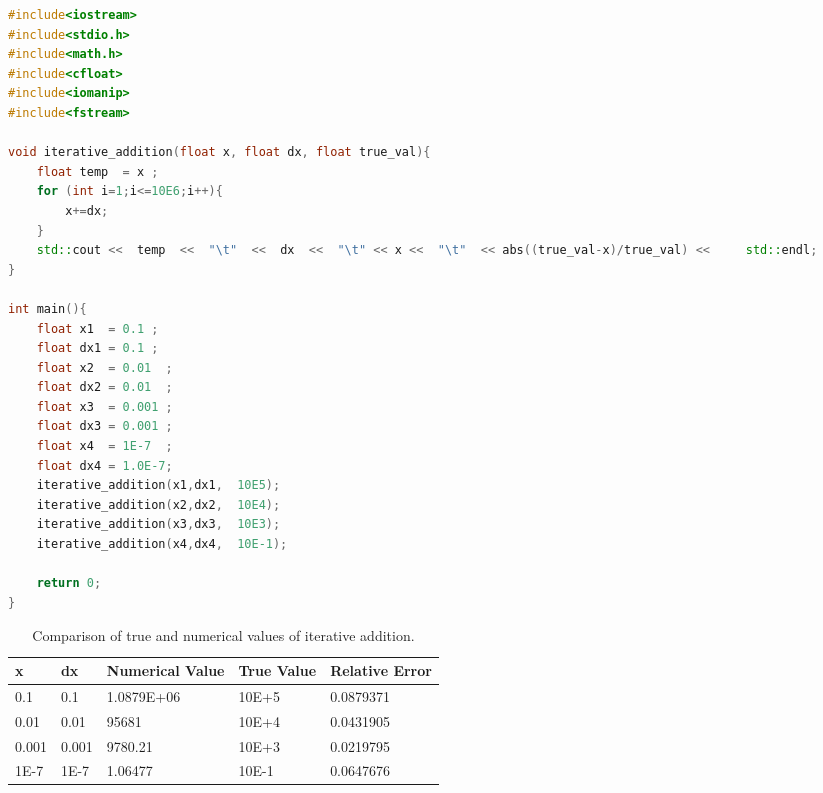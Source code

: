 \documentclass[a4,12pt]{article}
\numberwithin{equation}{subsection}
\begin{document}
 \begin{lstlisting}[language=C++, caption= C++ code to implement iterative addition algorithm., label= list2]
#include<iostream>
#include<stdio.h>
#include<math.h>
#include<cfloat>
#include<iomanip>
#include<fstream>

void iterative_addition(float x, float dx, float true_val){
    float temp  = x ;
    for (int i=1;i<=10E6;i++){
        x+=dx;
    }
    std::cout <<  temp  <<  "\t"  <<  dx  <<  "\t" << x <<  "\t"  << abs((true_val-x)/true_val) <<     std::endl;
}

int main(){
    float x1  = 0.1 ;
    float dx1 = 0.1 ;
    float x2  = 0.01  ;
    float dx2 = 0.01  ;
    float x3  = 0.001 ;
    float dx3 = 0.001 ;
    float x4  = 1E-7  ;
    float dx4 = 1.0E-7;  
    iterative_addition(x1,dx1,  10E5);
    iterative_addition(x2,dx2,  10E4);
    iterative_addition(x3,dx3,  10E3);
    iterative_addition(x4,dx4,  10E-1);

    return 0;
}
\end{lstlisting} 

\begin{table}[h]
\centering
\begin{tabular}{|l|l|l|l|l|}
\hline
\textbf{x} & \textbf{dx} & \textbf{Numerical Value} & \textbf{True Value} & \textbf{Relative Error} \\
\hline
0.1        & 0.1         & 1.0879E+06               & 10E+5               & 0.0879371               \\
0.01       & 0.01        & 95681                    & 10E+4               & 0.0431905               \\
0.001      & 0.001       & 9780.21                  & 10E+3               & 0.0219795               \\
1E-7       & 1E-7        & 1.06477                  & 10E-1               & 0.0647676 \\
\hline             
\end{tabular}
\caption{Comparison of true and numerical values of iterative addition.}
\label{tab:my-table}
\end{table}
\end{document}
